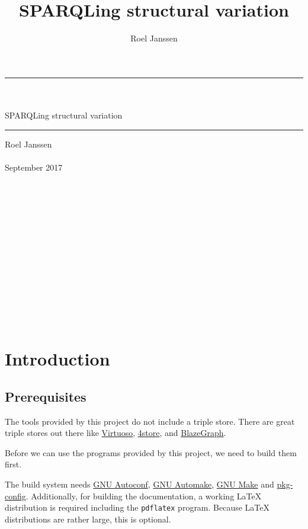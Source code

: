 \documentclass[11pt,a4paper,oneside]{book}
\title{SPARQLing structural variation}
\author{Roel Janssen}
\begin{document}
\begin{titlepage}
  \vspace*{\fill}
  \begin{center}
    \rule{\textwidth}{1.0pt}~\\~\\
    \Huge SPARQLing structural variation
    \rule{\textwidth}{1.0pt}
    \Large Roel Janssen~\\~\\
    \large September 2017
    ~\\~\\~\\~\\~\\~\\~\\~\\~\\~\\~\\~\\~\\~\\
  \end{center}
  \vspace*{\fill}

  \thispagestyle{empty}
\end{titlepage}


\setcounter{page}{1}
\hypersetup{linkcolor=black}
\tableofcontents
\newpage{}
\hypersetup{linkcolor=LinkGray}
\setcounter{page}{1}

\chapter{Introduction}

\section{Prerequisites}
\label{sec:prerequisites}

  The tools provided by this project do not include a triple store.  There are
  great triple stores out there like \href{https://virtuoso.openlinksw.com/}
  {Virtuoso}, \href{https://github.com/4store/4store}{4store}, and
  \href{https://www.blazegraph.com/}{BlazeGraph}.

  Before we can use the programs provided by this project, we need to build
  them first.

  The build system needs \href{https://www.gnu.org/software/autoconf}{GNU Autoconf},
  \href{https://www.gnu.org/software/automake}{GNU Automake},
  \href{https://www.gnu.org/software/make}{GNU Make} and
  \href{https://www.freedesktop.org/wiki/Software/pkg-config/}{pkg-config}.
  Additionally, for building the documentation, a working \LaTeX{} distribution is
  required including the \texttt{pdflatex} program.  Because \LaTeX{} distributions
  are rather large, this is optional.
\end{document}
